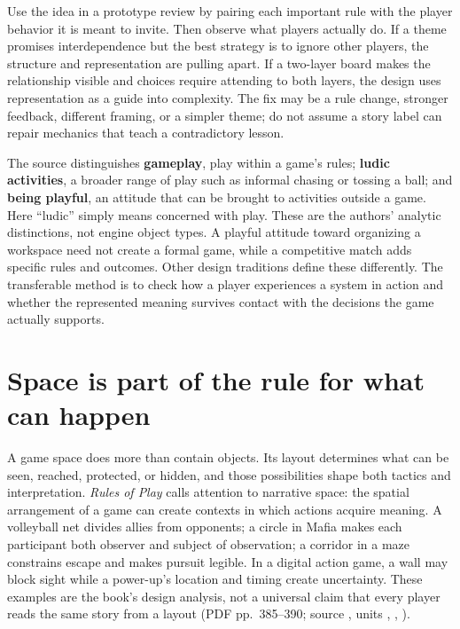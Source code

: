 Use the idea in a prototype review by pairing each important rule with the player behavior it is meant to invite. Then observe what players actually do. If a theme promises interdependence but the best strategy is to ignore other players, the structure and representation are pulling apart. If a two-layer board makes the relationship visible and choices require attending to both layers, the design uses representation as a guide into complexity. The fix may be a rule change, stronger feedback, different framing, or a simpler theme; do not assume a story label can repair mechanics that teach a contradictory lesson.

The source distinguishes \textbf{gameplay}, play within a game's rules; \textbf{ludic activities}, a broader range of play such as informal chasing or tossing a ball; and \textbf{being playful}, an attitude that can be brought to activities outside a game. Here ``ludic'' simply means concerned with play. These are the authors' analytic distinctions, not engine object types. A playful attitude toward organizing a workspace need not create a formal game, while a competitive match adds specific rules and outcomes. Other design traditions define these differently. The transferable method is to check how a player experiences a system in action and whether the represented meaning survives contact with the decisions the game actually supports.

\section{Space is part of the rule for what can happen}\label{06-engine-ii-ch047-space-is-part-of-the-rule-for-what-can-happen}

\hypertarget{06-engine-ii-ch047-space-is-part-of-the-rule-for-what-can-happen}{}

A game space does more than contain objects. Its layout determines what can be seen, reached, protected, or hidden, and those possibilities shape both tactics and interpretation. \emph{Rules of Play} calls attention to narrative space: the spatial arrangement of a game can create contexts in which actions acquire meaning. A volleyball net divides allies from opponents; a circle in Mafia makes each participant both observer and subject of observation; a corridor in a maze constrains escape and makes pursuit legible. In a digital action game, a wall may block sight while a power-up's location and timing create uncertainty. These examples are the book's design analysis, not a universal claim that every player reads the same story from a layout (PDF pp.~385--390; source , units , , ).


